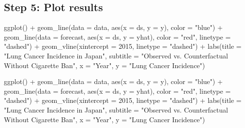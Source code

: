 \documentclass[
  letterpaper,
  DIV=11,
  numbers=noendperiod]{scrartcl}
\newenvironment{Shaded}{\begin{snugshade}}{\end{snugshade}}
\newcommand{\AttributeTok}[1]{\textcolor[rgb]{0.40,0.45,0.13}{#1}}
\newcommand{\DecValTok}[1]{\textcolor[rgb]{0.68,0.00,0.00}{#1}}
\newcommand{\FunctionTok}[1]{\textcolor[rgb]{0.28,0.35,0.67}{#1}}
\newcommand{\NormalTok}[1]{\textcolor[rgb]{0.00,0.23,0.31}{#1}}
\newcommand{\SpecialCharTok}[1]{\textcolor[rgb]{0.37,0.37,0.37}{#1}}
\newcommand{\StringTok}[1]{\textcolor[rgb]{0.13,0.47,0.30}{#1}}
\begin{document}
\hypertarget{step-5-plot-results-1}{%
\subsection{Step 5: Plot results}\label{step-5-plot-results-1}}

\begin{Shaded}
\begin{Highlighting}[]
\FunctionTok{ggplot}\NormalTok{() }\SpecialCharTok{+}
  \FunctionTok{geom\_line}\NormalTok{(}\AttributeTok{data =}\NormalTok{ data, }\FunctionTok{aes}\NormalTok{(}\AttributeTok{x =}\NormalTok{ ds, }\AttributeTok{y =}\NormalTok{ y), }\AttributeTok{color =} \StringTok{"blue"}\NormalTok{) }\SpecialCharTok{+}
  \FunctionTok{geom\_line}\NormalTok{(}\AttributeTok{data =}\NormalTok{ forecast, }\FunctionTok{aes}\NormalTok{(}\AttributeTok{x =}\NormalTok{ ds, }\AttributeTok{y =}\NormalTok{ yhat), }\AttributeTok{color =} \StringTok{"red"}\NormalTok{, }\AttributeTok{linetype =} \StringTok{"dashed"}\NormalTok{) }\SpecialCharTok{+}  \FunctionTok{geom\_vline}\NormalTok{(}\AttributeTok{xintercept =} \DecValTok{2015}\NormalTok{, }\AttributeTok{linetype =} \StringTok{"dashed"}\NormalTok{) }\SpecialCharTok{+}
  \FunctionTok{labs}\NormalTok{(}\AttributeTok{title =} \StringTok{"Lung Cancer Incidence in Japan"}\NormalTok{,}
       \AttributeTok{subtitle =} \StringTok{"Observed vs. Counterfactual Without Cigarette Ban"}\NormalTok{,}
       \AttributeTok{x =} \StringTok{"Year"}\NormalTok{,}
       \AttributeTok{y =} \StringTok{"Lung Cancer Incidence"}\NormalTok{)}
\end{Highlighting}
\end{Shaded}

\begin{Shaded}
\begin{Highlighting}[]
\FunctionTok{ggplot}\NormalTok{() }\SpecialCharTok{+}
  \FunctionTok{geom\_line}\NormalTok{(}\AttributeTok{data =}\NormalTok{ data, }\FunctionTok{aes}\NormalTok{(}\AttributeTok{x =}\NormalTok{ ds, }\AttributeTok{y =}\NormalTok{ y), }\AttributeTok{color =} \StringTok{"blue"}\NormalTok{) }\SpecialCharTok{+}
  \FunctionTok{geom\_line}\NormalTok{(}\AttributeTok{data =}\NormalTok{ forecast, }\FunctionTok{aes}\NormalTok{(}\AttributeTok{x =}\NormalTok{ ds, }\AttributeTok{y =}\NormalTok{ yhat), }\AttributeTok{color =} \StringTok{"red"}\NormalTok{, }\AttributeTok{linetype =} \StringTok{"dashed"}\NormalTok{) }\SpecialCharTok{+}  \FunctionTok{geom\_vline}\NormalTok{(}\AttributeTok{xintercept =} \DecValTok{2015}\NormalTok{, }\AttributeTok{linetype =} \StringTok{"dashed"}\NormalTok{) }\SpecialCharTok{+}
  \FunctionTok{labs}\NormalTok{(}\AttributeTok{title =} \StringTok{"Lung Cancer Incidence in Japan"}\NormalTok{,}
       \AttributeTok{subtitle =} \StringTok{"Observed vs. Counterfactual Without Cigarette Ban"}\NormalTok{,}
       \AttributeTok{x =} \StringTok{"Year"}\NormalTok{,}
       \AttributeTok{y =} \StringTok{"Lung Cancer Incidence"}\NormalTok{)}
\end{Highlighting}
\end{Shaded}
\end{document}
